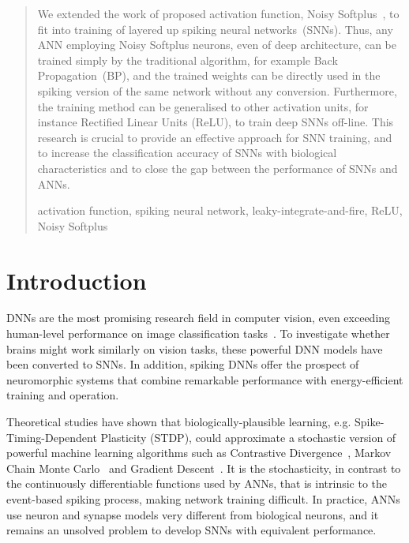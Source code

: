\documentclass[runningheads,a4paper]{llncs}
\newcommand{\keywords}[1]{\par\addvspace\baselineskip
\noindent\keywordname\enspace\ignorespaces#1}
\begin{document}
\maketitle


\begin{abstract}
 We extended the work of proposed activation function, Noisy Softplus~\cite{liu2016noisy}, to fit into training of layered up spiking neural networks~(SNNs).
 Thus, any ANN employing Noisy Softplus neurons, even of deep architecture, can be trained simply by the traditional algorithm, for example Back Propagation~(BP), and the trained weights can be directly used in the spiking version of the same network without any conversion.
 Furthermore, the training method can be generalised to other activation units, for instance Rectified Linear Units (ReLU), to train deep SNNs off-line.
 This research is crucial to provide an effective approach for SNN training, and to increase the classification accuracy of SNNs with biological characteristics and to close the gap between the performance of SNNs and ANNs.
\keywords{activation function, spiking neural network, leaky-integrate-and-fire, ReLU, Noisy Softplus}
\end{abstract}


\section{Introduction}
DNNs are the most promising research field in computer vision, even exceeding human-level performance on image classification tasks~\cite{he2015delving}.
To investigate whether brains might work similarly on vision tasks, these powerful DNN models have been converted to SNNs.
In addition, spiking DNNs offer the prospect of neuromorphic systems that combine remarkable performance with energy-efficient training and operation.

Theoretical studies have shown that biologically-plausible learning, e.g. Spike-Timing-Dependent Plasticity (STDP), could approximate a stochastic version of powerful machine learning algorithms
such as 
Contrastive Divergence~\cite{neftci2013event}, Markov Chain Monte Carlo~\cite{buesing2011neural} and Gradient Descent~\cite{o2016deep}.
It is the stochasticity, in contrast to the continuously differentiable functions used by ANNs, that is intrinsic to the event-based spiking process, making network training difficult.
In practice, ANNs use neuron and synapse models very different from biological neurons, and it remains an unsolved problem to develop SNNs with equivalent performance.
\end{document}
